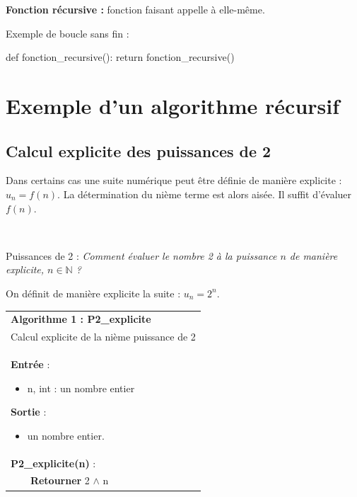 \documentclass[10pt,fleqn]{article} %
\newcommand{\bfsf}[1]{\small\textbf{\textsf{#1}}}%
\begin{document}
\begin{defi}
\textbf{Fonction récursive : } fonction faisant appelle à elle-même.
\end{defi}

\begin{py}Exemple de boucle sans fin :
\begin{python}
def fonction_recursive():
    return fonction_recursive()
\end{python}
\end{py}

\section{Exemple d'un algorithme récursif}
\subsection{Calcul explicite des puissances de 2}

Dans certains cas une suite numérique peut être définie de manière explicite : $u_n = f(n)$. 
La détermination du nième terme est alors aisée. Il suffit d’évaluer $f(n)$.

\begin{exemple}
$\;$

\begin{minipage}[c]{.35\linewidth}
Puissances de 2 : \textit{Comment évaluer le nombre 2 à la puissance $n$ de manière explicite, $n\in \mathbb{N}$ ?}

On définit de manière explicite la suite :  $u_n=2^n$.
\end{minipage}\hfill
\begin{minipage}{.6\linewidth}
\begin{pseudo}
\begin{tabular}{p{.5cm}p{6cm}}
\hline
\multicolumn{2}{l}{ \textbf{Algorithme 1 : P2\_explicite}}\\
\multicolumn{2}{l}{Calcul explicite de la nième puissance de 2} \\
\hline
\multicolumn{2}{p{6.5cm}}{
\textbf{Entrée} : 
\begin{itemize}
\item n, int  : un nombre entier
\end{itemize}
\textbf{Sortie} : 
\begin{itemize}
\item un nombre entier.
\end{itemize}}\\
\multicolumn{2}{l}{\bfsf{P2\_explicite(n)} :}  \\
& \bfsf{Retourner} 2 $\wedge$ n\\
\hline
\end{tabular}
\end{pseudo}
\end{minipage}

\end{exemple}
\end{document}
